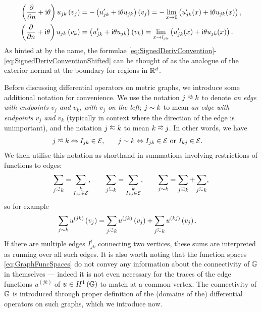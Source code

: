 \begin{subequations} \label{eq:SignedDerivConventionShifted}
	\begin{align*}
		\left( \dfrac{\partial }{\partial n}+ \mathrm{i}\theta \right)u_{jk}\left( v_j \right) &= -\left( u_{jk}' + \mathrm{i}\theta u_{jk} \right)\left( v_j \right) = -\lim_{x\rightarrow0} \left(  u_{jk}'(x)+\mathrm{i}\theta u_{jk}(x)  \right), \\
		\left( \dfrac{\partial }{\partial n}+ \mathrm{i}\theta \right)u_{jk}\left( v_k \right) &= \left( u_{jk}' + \mathrm{i}\theta u_{jk} \right)\left( v_k \right) = \lim_{x\rightarrow l_{jk}} \left(  u_{jk}'(x)+\mathrm{i}\theta u_{jk}(x)  \right).
	\end{align*}
\end{subequations}
As hinted at by the name, the formulae \eqref{eq:SignedDerivConvention}-\eqref{eq:SignedDerivConventionShifted} can be thought of as the analogue of the exterior normal at the boundary for regions in $\mathbb{R}^d$.

Before discussing differential operators on metric graphs, we introduce some additional notation for convenience.
We use the notation $j\conLeft k$ to denote \emph{an edge with endpoints $v_j$ and $v_k$, with $v_j$ on the left}; $j\sim k$ to mean \emph{an edge with endpoints $v_j$ and $v_k$} (typically in context where the direction of the edge is unimportant), and the notation $j \conRight k$ to mean $k\conLeft j$.
In other words, we have
\begin{align*}
	j\conLeft k \Leftrightarrow I_{jk}\in \edgeSet, &\qquad
	j\con k \Leftrightarrow I_{jk}\in \edgeSet \text{ or } I_{kj}\in \edgeSet.
\end{align*}
We then utilise this notation as shorthand in summations involving restrictions of functions to edges:
\begin{align*}
	\sum_{j\conLeft k} = \sum_{\substack{k \\ I_{jk}\in \edgeSet}}, 
	\qquad 	\sum_{j\conRight k} = \sum_{\substack{k \\ I_{kj}\in \edgeSet}},
	\qquad \sum_{j\con k} = \sum_{j\conLeft k} + \sum_{j\conRight k},
\end{align*}
so for example
\begin{align*}
	\sum_{j\con k}u^{(jk)}\bracs{v_j} &= \sum_{j\conLeft k}u^{(jk)}\bracs{v_j} + \sum_{j\conRight k}u^{(kj)}\bracs{v_j}.
\end{align*}
If there are multiple edges $I_{jk}^l$ connecting two vertices, these sums are interpreted as running over all such edges.
It is also worth noting that the function spaces \eqref{eq:GraphFuncSpaces} do not convey any information about the connectivity of $\mathbb{G}$ in themselves --- indeed it is not even necessary for the traces of the edge functions $u^{(jk)}$ of $u\in H^1\left( \mathbb{G} \right)$ to match at a common vertex. 
The connectivity of $\mathbb{G}$ is introduced through proper definition of the (domains of the) differential operators on such graphs, which we introduce now.

